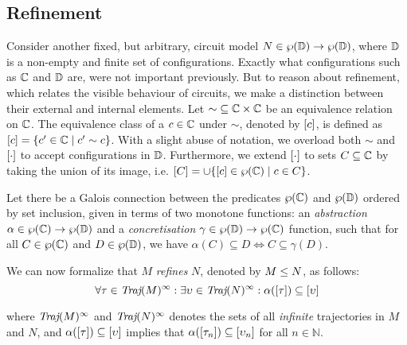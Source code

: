 \subsection{Refinement}

Consider another fixed, but arbitrary, circuit model $N \in \wp(\mathbb{D}) \rightarrow \wp(\mathbb{D})$, where $\mathbb{D}$ is a non-empty and finite set of configurations. Exactly what configurations such as $\mathbb{C}$ and $\mathbb{D}$ are, were not important previously. But to reason about refinement, which relates the visible behaviour of circuits, we make a distinction between their external and internal elements. Let ${\sim} \subseteq \mathbb{C} \times \mathbb{C}$ be an equivalence relation on $\mathbb{C}$. The equivalence class of a $c \in \mathbb{C}$ under $\sim$, denoted by $[c]$, is defined as $[c] = \{ c' \in \mathbb{C} \mid c' \sim c \}$. With a slight abuse of notation, we overload both $\sim$ and $[\cdot]$ to accept configurations in $\mathbb{D}$. Furthermore, we extend $[\cdot]$ to sets $C \subseteq \mathbb{C}$ by taking the union of its image, i.e. $[C] = \cup\{[c] \in \wp(\mathbb{C}) \mid c \in C \}$.


Let there be a Galois connection between the predicates $\wp(\mathbb{C})$ and $\wp(\mathbb{D})$ ordered by set inclusion, given in terms of two monotone functions: an \textit{abstraction} $\alpha \in \wp(\mathbb{C}) \rightarrow \wp(\mathbb{D})$ and a \textit{concretisation} $\gamma \in \wp(\mathbb{D}) \rightarrow \wp(\mathbb{C})$ function, such that for all $C \in \wp(\mathbb{C})$ and $D \in \wp(\mathbb{D})$, we have $\alpha(C) \subseteq D \iff C \subseteq \gamma(D)$. 


We can now formalize that $M$ \textit{refines} $N$, denoted by $M \leq N$, as follows:
%
\begin{equation*}
\forall \tau \in \operatorname{\textit{Traj}}(M)^{\infty} : \exists \upsilon \in \operatorname{\textit{Traj}}(N)^{\infty} : \alpha([\tau]) \subseteq [\upsilon]
\end{equation*}

\noindent where $\operatorname{\textit{Traj}}(M)^{\infty}$ and $\operatorname{\textit{Traj}}(N)^{\infty}$ denotes the sets of all \textit{infinite} trajectories in $M$ and $N$, and $\alpha([\tau]) \subseteq [\upsilon]$ implies that $\alpha([\tau_{n}]) \subseteq [\upsilon_{n}]$ for all $n \in \mathbb{N}$.  

